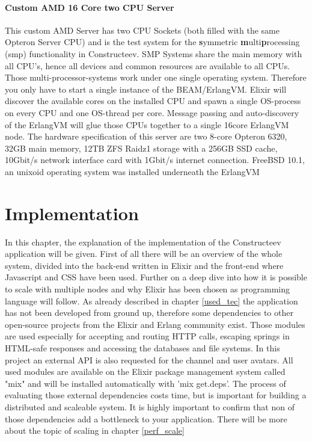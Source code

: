\subsubsection{Custom AMD 16 Core two CPU Server} 
This custom AMD Server has two CPU Sockets (both filled with the same Opteron Server CPU) and is the test system for the \textbf{s}ymmetric \textbf{m}ulti\textbf{p}rocessing (smp) functionality in Constructeev. SMP Systems share the main memory with all CPU's, hence all devices and common resources are available to all CPUs. Those multi-processor-systems work under one single operating system. Therefore you only have to start a single instance of the BEAM/ErlangVM. Elixir will discover the available cores on the installed CPU and spawn a single OS-process on every CPU and one OS-thread per core. Message passing and auto-discovery of the ErlangVM will glue those CPUs together to a single 16core ErlangVM node. The hardware specification of this server are two 8-core Opteron 6320, 32GB main memory, 12TB ZFS Raidz1 storage with a 256GB SSD cache, 10Gbit/s network interface card with 1Gbit/s internet connection. FreeBSD 10.1, an unixoid operating system was installed underneath the ErlangVM


\chapter{Implementation}
In this chapter, the explanation of the implementation of the Constructeev application will be given. First of all there will be an overview of the whole system, divided into the back-end written in Elixir and the front-end where Javascript and CSS have been used. 
Further on a deep dive into how it is possible to scale with multiple nodes \textcolor{newcode}{ and why Elixir has been chosen as programming language} will follow.
As already described in chapter \ref{used_tec} the application has not been developed from ground up, therefore some dependencies to other open-source projects from the Elixir and Erlang community exist. Those modules are used especially for accepting and routing HTTP calls, escaping springs in HTML-safe responses and accessing the databases and file systems. In this project an external API is also requested for the channel and user avatars. All used modules are available on the Elixir package management system called "mix" and will be installed automatically with 'mix get.deps'. The process of evaluating those external dependencies costs time, but is important for building a distributed and scaleable system. It is highly important to confirm that non of those dependencies add a bottleneck to your application. There will be more  about the topic of scaling in chapter \ref{perf_scale}

